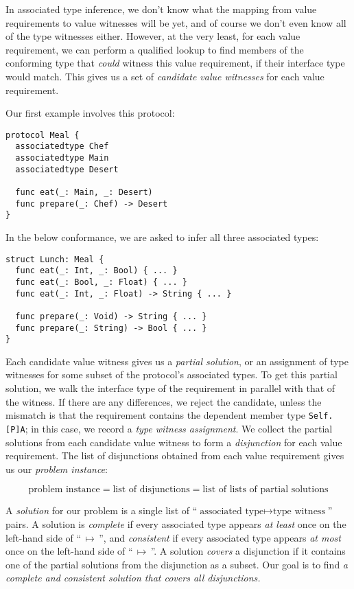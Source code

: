 \documentclass[../generics]{subfiles}
\begin{document}
In associated type inference, we don't know what the mapping from value requirements to value witnesses will be yet, and of course we don't even know all of the type witnesses either. However, at the very least, for each value requirement, we can perform a qualified lookup to find members of the conforming type that \emph{could} witness this value requirement, if their interface type would match. This gives us a set of \emph{candidate value witnesses} for each value requirement. 

\begin{example}\label{assoc type inference example 1}
Our first example involves this protocol:
\begin{Verbatim}
protocol Meal {
  associatedtype Chef
  associatedtype Main
  associatedtype Desert

  func eat(_: Main, _: Desert)
  func prepare(_: Chef) -> Desert
}
\end{Verbatim}
In the below conformance, we are asked to infer all three associated types:
\begin{Verbatim}
struct Lunch: Meal {
  func eat(_: Int, _: Bool) { ... }
  func eat(_: Bool, _: Float) { ... }
  func eat(_: Int, _: Float) -> String { ... }

  func prepare(_: Void) -> String { ... }
  func prepare(_: String) -> Bool { ... }
}
\end{Verbatim}
\end{example}

Each candidate value witness gives us a \emph{partial solution}, or an assignment of type witnesses for some subset of the protocol's associated types. To get this partial solution, we walk the interface type of the requirement in parallel with that of the witness. If there are any differences, we reject the candidate, unless the mismatch is that the requirement contains the dependent member type \texttt{Self.[P]A}; in this case, we record a \emph{type witness assignment}. We collect the partial solutions from each candidate value witness to form a \emph{disjunction} for each value requirement. The list of disjunctions obtained from each value requirement gives us our \emph{problem instance}:
\begin{ceqn}
\[
\text{problem instance} = \text{list of disjunctions} = \text{list of lists of partial solutions}
\]
\end{ceqn}

A \emph{solution} for our problem is a single list of ``$\text{associated type} \mapsto \text{type witness}$'' pairs. A solution is \emph{complete} if every associated type appears \emph{at least} once on the left-hand side of ``$\,\mapsto\,$'', and \emph{consistent} if every associated type appears \emph{at most} once on the left-hand side of ``$\,\mapsto\,$''. A solution \emph{covers} a disjunction if it contains one of the partial solutions from the disjunction as a subset. Our goal is to find \textsl{a complete and consistent solution that covers all disjunctions.}
\end{document}
